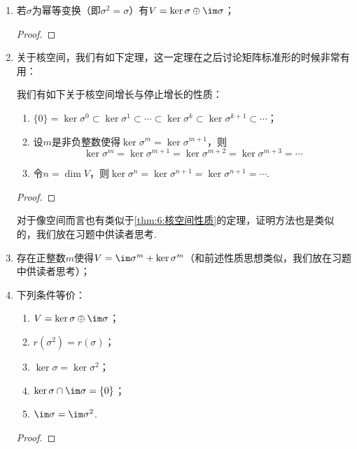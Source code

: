 \begin{enumerate}
    \item 若$\sigma$为幂等变换（即$\sigma^2=\sigma$）有$V=\ker\sigma\oplus\im \sigma$；

    \begin{proof}
        
    \end{proof}

    \item 关于核空间，我们有如下定理，这一定理在之后讨论矩阵标准形的时候非常有用：
    \begin{theorem}\label{thm:6:核空间性质}
        我们有如下关于核空间增长与停止增长的性质：
        \begin{enumerate}
            \item $\{0\}=\ker \sigma^0\subset\ker \sigma^1\subset\cdots\subset
            \ker \sigma^k\subset\ker \sigma^{k+1}\subset\cdots$；
    
            \item 设$m$是非负整数使得$\ker \sigma^m=\ker \sigma^{m+1}$，则
            \[\ker \sigma^m=\ker \sigma^{m+1}=\ker \sigma^{m+2}=\ker \sigma^{m+3}=\cdots\]
    
            \item 令$n=\dim V$，则$\ker \sigma^n=\ker \sigma^{n+1}=\ker \sigma^{n+1}=\cdots$.
        \end{enumerate}
    \end{theorem}
    \begin{proof}
        
    \end{proof}
    对于像空间而言也有类似于\autoref{thm:6:核空间性质}的定理，证明方法也是类似的，我们放在习题中供读者思考.
    \item 存在正整数$m$使得$V=\im \sigma^m+\ker\sigma^m$（和前述性质思想类似，我们放在习题中供读者思考）；
    \item 下列条件等价：
    \begin{enumerate}[label=(\arabic*)]
        \item $V=\ker\sigma\oplus\im \sigma$；
        \item $r(\sigma^2)=r(\sigma)$；
        \item $\ker\sigma=\ker\sigma^2$；
        \item $\ker\sigma \cap \im \sigma=\{0\}$；
        \item $\im \sigma=\im \sigma^2$.
    \end{enumerate}
    \begin{proof}
        

\end{proof}
\end{enumerate}
